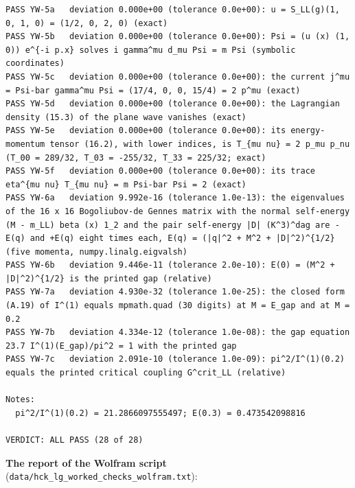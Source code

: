 \documentclass[
  10pt,
]{article}
\begin{document}
\begin{verbatim}
PASS YW-5a   deviation 0.000e+00 (tolerance 0.0e+00): u = S_LL(g)(1, 0, 1, 0) = (1/2, 0, 2, 0) (exact)
PASS YW-5b   deviation 0.000e+00 (tolerance 0.0e+00): Psi = (u (x) (1, 0)) e^{-i p.x} solves i gamma^mu d_mu Psi = m Psi (symbolic coordinates)
PASS YW-5c   deviation 0.000e+00 (tolerance 0.0e+00): the current j^mu = Psi-bar gamma^mu Psi = (17/4, 0, 0, 15/4) = 2 p^mu (exact)
PASS YW-5d   deviation 0.000e+00 (tolerance 0.0e+00): the Lagrangian density (15.3) of the plane wave vanishes (exact)
PASS YW-5e   deviation 0.000e+00 (tolerance 0.0e+00): its energy-momentum tensor (16.2), with lower indices, is T_{mu nu} = 2 p_mu p_nu (T_00 = 289/32, T_03 = -255/32, T_33 = 225/32; exact)
PASS YW-5f   deviation 0.000e+00 (tolerance 0.0e+00): its trace eta^{mu nu} T_{mu nu} = m Psi-bar Psi = 2 (exact)
PASS YW-6a   deviation 9.992e-16 (tolerance 1.0e-13): the eigenvalues of the 16 x 16 Bogoliubov-de Gennes matrix with the normal self-energy (M - m_LL) beta (x) 1_2 and the pair self-energy |D| (K^3)^dag are -E(q) and +E(q) eight times each, E(q) = (|q|^2 + M^2 + |D|^2)^{1/2} (five momenta, numpy.linalg.eigvalsh)
PASS YW-6b   deviation 9.446e-11 (tolerance 2.0e-10): E(0) = (M^2 + |D|^2)^{1/2} is the printed gap (relative)
PASS YW-7a   deviation 4.930e-32 (tolerance 1.0e-25): the closed form (A.19) of I^(1) equals mpmath.quad (30 digits) at M = E_gap and at M = 0.2
PASS YW-7b   deviation 4.334e-12 (tolerance 1.0e-08): the gap equation 23.7 I^(1)(E_gap)/pi^2 = 1 with the printed gap
PASS YW-7c   deviation 2.091e-10 (tolerance 1.0e-09): pi^2/I^(1)(0.2) equals the printed critical coupling G^crit_LL (relative)

Notes:
  pi^2/I^(1)(0.2) = 21.2866097555497; E(0.3) = 0.473542098816

VERDICT: ALL PASS (28 of 28)
\end{verbatim}

\textbf{The report of the Wolfram script}
(\texttt{data/hck\_lg\_worked\_checks\_wolfram.txt}):
\end{document}
